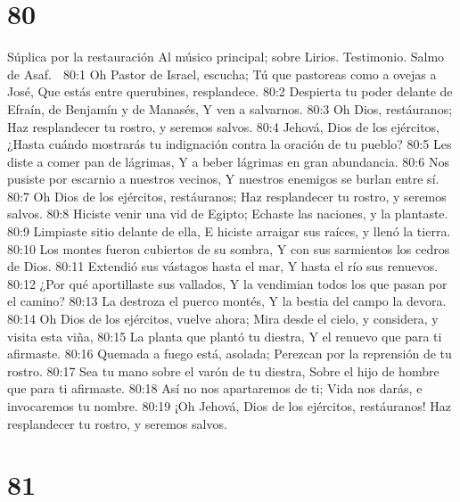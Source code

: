 \chapter{80}

Súplica por la restauración 
Al músico principal; sobre Lirios. Testimonio. Salmo de Asaf. 

80:1 Oh Pastor de Israel, escucha; 
Tú que pastoreas como a ovejas a José, 
Que estás entre querubines, resplandece. 
80:2 Despierta tu poder delante de Efraín, de Benjamín y de Manasés, 
Y ven a salvarnos. 
80:3 Oh Dios, restáuranos; 
Haz resplandecer tu rostro, y seremos salvos. 
80:4 Jehová, Dios de los ejércitos, 
¿Hasta cuándo mostrarás tu indignación contra la oración de tu pueblo? 
80:5 Les diste a comer pan de lágrimas, 
Y a beber lágrimas en gran abundancia. 
80:6 Nos pusiste por escarnio a nuestros vecinos, 
Y nuestros enemigos se burlan entre sí. 
80:7 Oh Dios de los ejércitos, restáuranos; 
Haz resplandecer tu rostro, y seremos salvos. 
80:8 Hiciste venir una vid de Egipto; 
Echaste las naciones, y la plantaste. 
80:9 Limpiaste sitio delante de ella, 
E hiciste arraigar sus raíces, y llenó la tierra. 
80:10 Los montes fueron cubiertos de su sombra, 
Y con sus sarmientos los cedros de Dios. 
80:11 Extendió sus vástagos hasta el mar, 
Y hasta el río sus renuevos. 
80:12 ¿Por qué aportillaste sus vallados, 
Y la vendimian todos los que pasan por el camino? 
80:13 La destroza el puerco montés, 
Y la bestia del campo la devora. 
80:14 Oh Dios de los ejércitos, vuelve ahora; 
Mira desde el cielo, y considera, y visita esta viña, 
80:15 La planta que plantó tu diestra, 
Y el renuevo que para ti afirmaste. 
80:16 Quemada a fuego está, asolada; 
Perezcan por la reprensión de tu rostro. 
80:17 Sea tu mano sobre el varón de tu diestra, 
Sobre el hijo de hombre que para ti afirmaste. 
80:18 Así no nos apartaremos de ti; 
Vida nos darás, e invocaremos tu nombre. 
80:19 ¡Oh Jehová, Dios de los ejércitos, restáuranos! 
Haz resplandecer tu rostro, y seremos salvos. 

\chapter{81}

